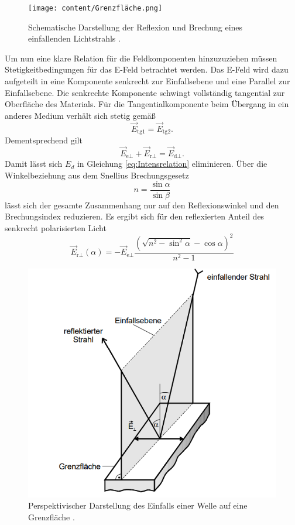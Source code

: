 \begin{figure}[H]
    \centering
    \texttt{[image: content/Grenzfläche.png]}
    \caption{Schematische Darstellung der Reflexion und Brechung eines einfallenden Lichtstrahls \cite{sample}.}
    \label{fig:Grenz}
\end{figure}
\noindent Um nun eine klare Relation für die Feldkomponenten hinzuzuziehen müssen Stetigkeitbedingungen 
für das E-Feld betrachtet werden. Das E-Feld wird dazu aufgeteilt in eine Komponente senkrecht zur Einfallsebene und eine Parallel zur 
Einfallsebene. Die senkrechte Komponente schwingt vollständig tangential zur Oberfläche des Materials.
Für die Tangentialkomponente beim Übergang in ein anderes Medium verhält sich stetig gemäß
\begin{equation*}
    \vec{E}_\text{tg1}=\vec{E}_\text{tg2}.
\end{equation*}
Dementsprechend gilt
\begin{equation}
    \vec{E}_{\text{e}\perp}+ \vec{E}_{\text{r}\perp}= \vec{E}_{\text{d}\perp}.
    \label{eq:EsenkStet}
\end{equation}
Damit lässt sich $E_d$ in Gleichung \eqref{eq:Intensrelation} eliminieren. Über die Winkelbeziehung aus dem Snellius
Brechungsgesetz
\begin{equation}
    n=\frac{\sin{\alpha}}{\sin{\beta}}
    \label{eq:Snellius}
\end{equation}
lässt sich der gesamte Zusammenhang nur auf den Reflexionswinkel und den Brechungsindex reduzieren.  Es ergibt sich für den reflexierten Anteil des senkrecht polarisierten Licht
\begin{equation}
    \vec{E}_{\text{r}\perp}(\alpha)=-\vec{E}_{\text{e}\perp}\frac{\left(\sqrt{n^2-\sin^2{\alpha}}-\cos\alpha\right)^2}{n^2-1}
    \label{eq:Esenk}
\end{equation}
\begin{figure}[H]
    \centering
    \includegraphics[scale=1]{content/Einfallsebene.png}
    \caption{Perspektivischer Darstellung des Einfalls einer Welle auf eine Grenzfläche \cite{sample}.}
    \label{fig:Einfall}
\end{figure}
